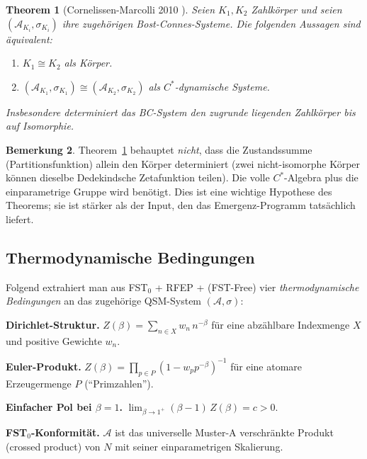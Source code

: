 \documentclass[11pt,a4paper]{article}
\theoremstyle{plain}
\newtheorem{theorem}{Theorem}[section]
\theoremstyle{definition}
\newtheorem{remark}[theorem]{Bemerkung}
\begin{document}
\begin{theorem}[Cornelissen-Marcolli
2010 \cite{CornelissenMarcolli2010}]\label{thm:cm-rigidity}
Seien $K_1, K_2$ Zahlkörper und seien $(\mathcal A_{K_i},
\sigma_{K_i})$ ihre zugehörigen Bost-Connes-Systeme. Die folgenden Aussagen
sind äquivalent:
\begin{enumerate}[label=(\roman*)]
\item $K_1 \cong K_2$ als Körper.
\item $(\mathcal A_{K_1}, \sigma_{K_1}) \cong (\mathcal A_{K_2},
  \sigma_{K_2})$ als $C^\ast$-dynamische Systeme.
\end{enumerate}
Insbesondere determiniert das BC-System den zugrunde liegenden Zahlkörper
bis auf Isomorphie.
\end{theorem}

\begin{remark}
Theorem~\ref{thm:cm-rigidity} behauptet \emph{nicht}, dass die
Zustandssumme (Partitionsfunktion) allein den Körper determiniert (zwei
nicht-isomorphe Körper können dieselbe Dedekindsche Zetafunktion teilen).
Die volle $C^\ast$-Algebra plus die einparametrige Gruppe wird benötigt.
Dies ist eine wichtige Hypothese des Theorems; sie ist stärker als der Input, den
das Emergenz-Programm tatsächlich liefert.
\end{remark}

\subsection{Thermodynamische Bedingungen}
\label{sec:thermo-B}

Folgend \cite{LemmaThreeTwo,ThermoDerivation} extrahiert man aus
FST$_0$ + RFEP + (FST-Free) vier \emph{thermodynamische Bedingungen} an
das zugehörige QSM-System $(\mathcal A, \sigma)$:

\begin{description}[leftmargin=*,style=nextline]
\item[(B1)] \textbf{Dirichlet-Struktur.} $Z(\beta) = \sum_{n \in X}
  w_n\, n^{-\beta}$ für eine abzählbare Indexmenge $X$ und positive
  Gewichte $w_n$.
\item[(B2)] \textbf{Euler-Produkt.} $Z(\beta) = \prod_{p \in P}
  (1-w_p p^{-\beta})^{-1}$ für eine atomare Erzeugermenge $P$
  (``Primzahlen'').
\item[(B3)] \textbf{Einfacher Pol bei $\beta=1$.} $\lim_{\beta \to 1^+}
  (\beta-1)\, Z(\beta) = c > 0$.
\item[(B4)] \textbf{FST$_0$-Konformität.} $\mathcal A$ ist das
  universelle Muster-A verschränkte Produkt (crossed product) von $N$
  mit seiner einparametrigen Skalierung.
\end{description}
\end{document}
